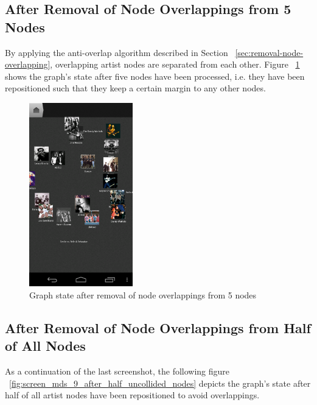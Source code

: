 \newpage
\subsection{After Removal of Node Overlappings from 5 Nodes}

By applying the anti-overlap algorithm described in Section ~\ref{sec:removal-node-overlapping}, overlapping artist nodes are separated from each other. Figure ~\ref{fig:screen_mds_8_after_5_uncollided_nodes} shows the graph's state after five nodes have been processed, i.e. they have been repositioned such that they keep a certain margin to any other nodes.

\begin{figure}[H]
  \centering
    \includegraphics[width=0.4\textwidth]{figures/screen_mds_8_after_5_uncollided_nodes}
  \caption{Graph state after removal of node overlappings from 5 nodes}
  \label{fig:screen_mds_8_after_5_uncollided_nodes}
\end{figure}

\newpage
\subsection{After Removal of Node Overlappings from Half of All Nodes}

As a continuation of the last screenshot, the following figure ~\ref{fig:screen_mds_9_after_half_uncollided_nodes} depicts the graph's state after half of all artist nodes have been repositioned to avoid overlappings.

